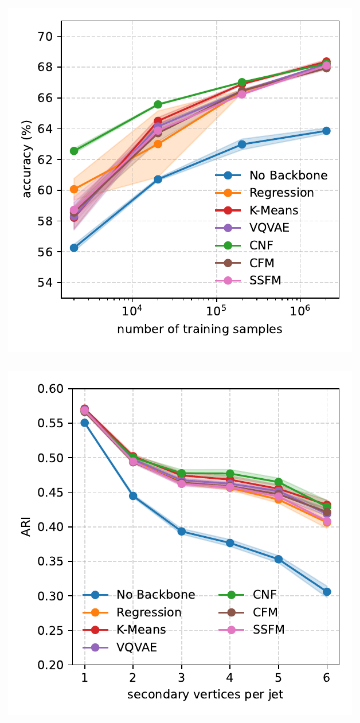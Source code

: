\begin{figure}[h!]
    \centering
    \begin{subfigure}{0.32\linewidth}
        \centering
        \includegraphics[width=\linewidth]{Figures/foundation_models/mpm2/final/btag_frozen.pdf}
        \caption{}
        \label{fig:btag_frozen}
    \end{subfigure}
    \begin{subfigure}[b]{0.32\textwidth}
        \centering
        \includegraphics[width=\linewidth]{Figures/foundation_models/mpm2/final/vtx_frozen_ari.pdf}

\end{subfigure}
\end{figure}
